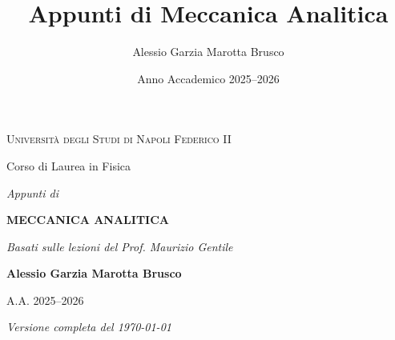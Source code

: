 \documentclass[11pt, a4paper, twoside]{book}
\title{Appunti di Meccanica Analitica}
\author{Alessio Garzia Marotta Brusco}
\date{Anno Accademico 2025--2026}
\begin{document}
\frontmatter
\hypersetup{pageanchor=false}
\begin{titlepage}
    \centering

    \vspace*{0.08\textheight}
    {\large \scshape Università degli Studi di Napoli Federico II \par}
    \vspace{0.2cm}
    {\large Corso di Laurea in Fisica \par}

    \vspace{3.5cm} 

    {\large \textit{Appunti di}\par}
    \vspace{0.3cm} 
    {\fontsize{35.83}{40}\selectfont \bfseries MECCANICA ANALITICA \par}
    \vspace{0.8cm}
    {\small \textit{Basati sulle lezioni del Prof. Maurizio Gentile} \par}

    \vspace{3.5cm}

    {\large \textbf{Alessio Garzia Marotta Brusco} \par}
    \vspace{0.2cm}
    {\large A.A. 2025--2026 \par}

    \vfill 

    {\small \textit{Versione completa del \today} \par}
    \vspace{1cm}

\end{titlepage}
\clearpage
\hypersetup{pageanchor=true}





\tableofcontents

\mainmatter






\backmatter
\printbibliography
\end{document}
